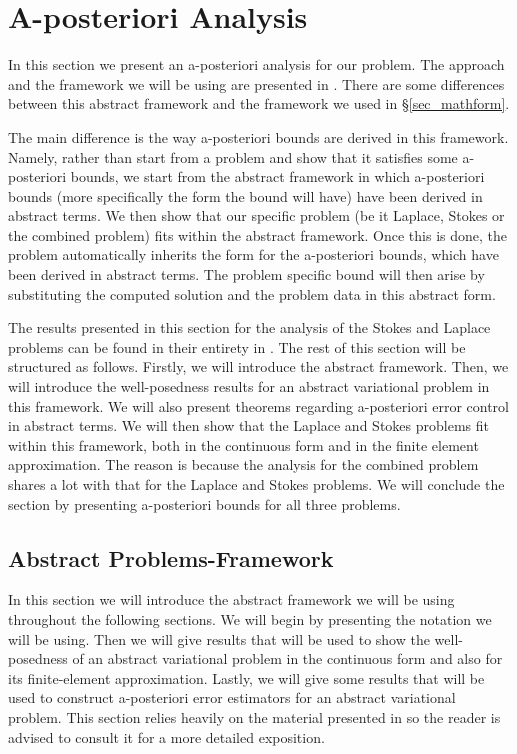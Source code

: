 \documentclass[12pt,a4paper]{article}
\theoremstyle{definition}
\begin{document}
\section{A-posteriori Analysis} \label{sec_aposteriori_analysis}
In this section we present an a-posteriori analysis for our problem.  The approach and the framework we will be using are presented in \cite{verfurth2013posteriori}.  There are some differences between this abstract framework and the framework we used in \S \ref{sec_mathform}.  

The main difference is the way a-posteriori bounds are derived in this framework.  Namely,  rather than start from a problem and show that it satisfies some a-posteriori bounds, we start from the abstract framework in which a-posteriori bounds (more specifically the form the bound will have) have been derived in abstract terms.  We then show that our specific problem (be it Laplace, Stokes or the combined problem) fits within the abstract framework.  Once this is done, the problem automatically inherits the form for the  a-posteriori  bounds, which have been derived in abstract terms.  The problem specific bound will then arise  by substituting the computed solution and the problem data in this abstract form. 

The results presented in this section for the analysis of the Stokes and Laplace problems can be found in their entirety in \cite[\S4]{verfurth2013posteriori}. The rest of this section will be structured as follows.  Firstly, we will introduce the abstract framework.  Then, we will introduce the well-posedness results for an abstract variational problem in this framework.   We will also present theorems regarding a-posteriori error control in abstract terms.  We will then show that the Laplace and Stokes problems fit within this framework, both in the continuous form and in the finite element approximation. The reason is because the analysis for the combined problem shares a lot with that for the Laplace and Stokes problems.   We will conclude the section by presenting a-posteriori bounds for all three problems.   


\subsection{Abstract Problems-Framework}\label{sec_abst_var_prob}
In this section we will introduce the abstract framework we will be using throughout the following sections.  We will begin by presenting the notation we will be using.  Then we will give results that will be used to show the well-posedness of an abstract variational problem in the continuous form and also for its finite-element approximation.  Lastly, we will give some results that will be used to construct a-posteriori error estimators for an abstract variational problem. This section relies heavily on the material presented in   \cite[\S 4.1]{verfurth2013posteriori} so the reader is advised to consult it for a more detailed exposition.
\end{document}
